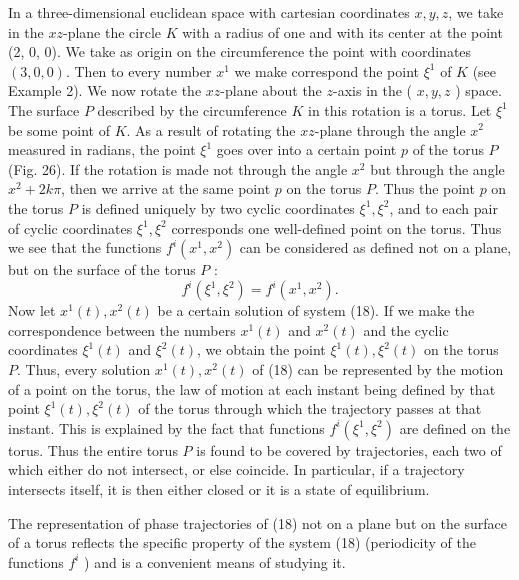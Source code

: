 \documentclass[10pt,a5paper]{book}
\theoremstyle{plain}
\theoremstyle{definition}
\theoremstyle{remark}
\begin{document}
In a three-dimensional euclidean space with cartesian coordinates $x, y, z$, we take in the $x z$-plane the circle $K$ with a radius of one and with its center at the point (2, 0, 0). We take as origin on the circumference the point with coordinates $(3,0,0)$. Then to every number $x^{1}$ we make correspond the point $\xi^{1}$ of $K$ (see Example 2). We now rotate the $x z$-plane about the $z$-axis in the ( $x, y, z$ ) space. The surface $P$ described by the circumference $K$ in this rotation is a torus. Let $\xi^{1}$ be some point of $K$. As a result of rotating the $x z$-plane through the angle $x^{2}$ measured in radians, the point $\xi^{1}$ goes over into a certain point $p$ of the torus $P$ (Fig. 26). If the rotation is made not through the angle $x^{2}$ but through the angle $x^{2}+2 k \pi$, then we arrive at the same point $p$ on the torus $P$. Thus the point $p$ on the torus $P$ is defined uniquely by two cyclic coordinates $\xi^{1}, \xi^{2}$, and to each pair of cyclic coordinates $\xi^{1}, \xi^{2}$ corresponds one well-defined point on the torus. Thus we see that the functions $f^{i}\left(x^{1}, x^{2}\right)$ can be considered as defined not on a plane, but on the surface of the torus $P$ :
\[
f^{i}\left(\xi^{1}, \xi^{2}\right)=f^{i}\left(x^{1}, x^{2}\right) .
\]
Now let $x^{1}(t), x^{2}(t)$ be a certain solution of system (18). If we make the correspondence between the numbers $x^{1}(t)$ and $x^{2}(t)$ and the cyclic coordinates $\xi^{1}(t)$ and $\xi^{2}(t)$, we obtain the point $\xi^{1}(t), \xi^{2}(t)$ on the torus $P$. Thus, every solution $x^{1}(t), x^{2}(t)$ of (18) can be represented by the motion of a point on the torus, the law of motion at each instant being defined by that point $\xi^{1}(t), \xi^{2}(t)$ of the torus through which the trajectory passes at
that instant. This is explained by the fact that functions $f^{i}\left(\xi^{1}, \xi^{2}\right)$ are defined on the torus. Thus the entire torus $P$ is found to be covered by trajectories, each two of which either do not intersect, or else coincide. In particular, if a trajectory intersects itself, it is then either closed or it is a state of equilibrium.

The representation of phase trajectories of (18) not on a plane but on the surface of a torus reflects the specific property of the system (18) (periodicity of the functions $f^{i}$ ) and is a convenient means of studying it.
\end{document}
